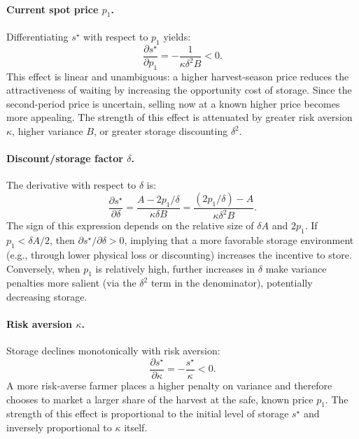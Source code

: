 \paragraph{Current spot price \(p_1\).}
Differentiating \(s^{\star}\) with respect to \(p_1\) yields:
$$
\frac{\partial s^{\star}}{\partial p_1} = -\frac{1}{\kappa \delta^2 B} < 0.
$$
This effect is linear and unambiguous: a higher harvest-season price reduces the attractiveness of waiting by increasing the opportunity cost of storage. Since the second-period price is uncertain, selling now at a known higher price becomes more appealing. The strength of this effect is attenuated by greater risk aversion \(\kappa\), higher variance \(B\), or greater storage discounting \(\delta^2\).

\paragraph{Discount/storage factor \(\delta\).}
The derivative with respect to \(\delta\) is:
$$
\frac{\partial s^{\star}}{\partial \delta}
=
\frac{A - 2p_1/\delta}{\kappa \delta B}
=
\frac{(2p_1/\delta) - A}{\kappa \delta^2 B}.
$$
The sign of this expression depends on the relative size of \(\delta A\) and \(2p_1\). If \(p_1 < \delta A / 2\), then \(\partial s^{\star}/\partial \delta > 0\), implying that a more favorable storage environment (e.g., through lower physical loss or discounting) increases the incentive to store. Conversely, when \(p_1\) is relatively high, further increases in \(\delta\) make variance penalties more salient (via the \(\delta^2\) term in the denominator), potentially decreasing storage.

\paragraph{Risk aversion \(\kappa\).}
Storage declines monotonically with risk aversion:
$$
\frac{\partial s^{\star}}{\partial \kappa}
=
-\frac{s^{\star}}{\kappa} < 0.
$$
A more risk-averse farmer places a higher penalty on variance and therefore chooses to market a larger share of the harvest at the safe, known price \(p_1\). The strength of this effect is proportional to the initial level of storage \(s^{\star}\) and inversely proportional to \(\kappa\) itself.


